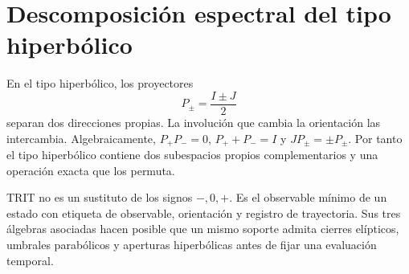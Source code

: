 \section{Descomposición espectral del tipo hiperbólico}

En el tipo hiperbólico, los proyectores
\[
P_\pm=\frac{I\pm J}{2}
\]
separan dos direcciones propias. La involución que cambia la orientación las
intercambia. Algebraicamente, \(P_+P_-=0\), \(P_++P_-=I\) y
\(JP_\pm=\pm P_\pm\). Por tanto el tipo hiperbólico contiene dos subespacios
propios complementarios y una operación exacta que los permuta.

\begin{remark}
TRIT no es un sustituto de los signos \(-,0,+\). Es el observable mínimo de
un estado con etiqueta de observable, orientación y registro de trayectoria.
Sus tres álgebras asociadas hacen posible
que un mismo soporte admita cierres elípticos, umbrales parabólicos y aperturas
hiperbólicas antes de fijar una evaluación temporal.
\end{remark}
\fi
